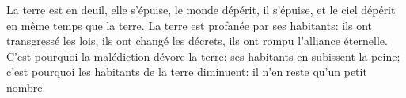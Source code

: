 La terre est en deuil, elle s’épuise, le monde dépérit, il s’épuise,
	et le ciel dépérit en même temps que la terre.
La terre est profanée par ses habitants:
	ils ont transgressé les lois, ils ont changé les décrets,
	ils ont rompu l’alliance éternelle.
C’est pourquoi la malédiction dévore la terre:
	ses habitants en subissent la peine;
	c’est pourquoi les habitants de la terre diminuent:
	il n’en reste qu’un petit nombre.
